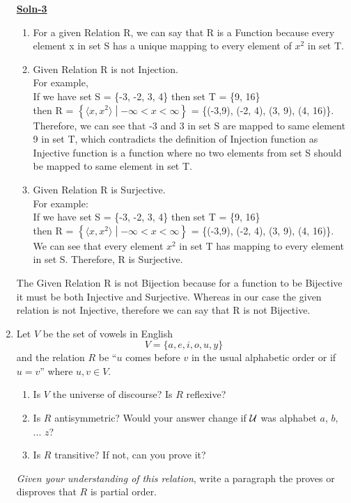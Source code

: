 \documentclass{article}
\begin{document}
\begin{enumerate}
        \textbf{\underline{Soln-3}} 
        \begin{enumerate}
            \item   For a given Relation R, we can say that R is a Function because every element x in set S has a unique mapping to every element of $x^2$ in set T.
            \item   Given Relation R is not Injection. \\
            For example, \\
            If we have set S = \{-3, -2, 3, 4\} then set T = \{9, 16\} \\
            then R = $\left\{ \langle x, x^2 \rangle \middle|-\infty < x < \infty \right\}$ = \{(-3,9), (-2, 4), (3, 9), (4, 16)\}. \\
            Therefore, we can see that -3 and 3 in set S are mapped to same element 9 in set T, 
            which contradicts the definition of Injection function as Injective function is a function where no two elements from set S 
            should be mapped to same element in set T.
            \item  Given Relation R is Surjective. \\
            For example: \\
            If we have set S = \{-3, -2, 3, 4\} then set T = \{9, 16\} \\
            then R = $\left\{ \langle x, x^2 \rangle \middle|-\infty < x < \infty \right\}$ = \{(-3,9), (-2, 4), (3, 9), (4, 16)\}. \\
            We can see that every element $x^2$ in set T has mapping to every element in set S. Therefore, R is Surjective.
        \end{enumerate}

        The Given Relation R is not Bijection because for a function to be Bijective it must be both Injective and Surjective. 
        Whereas in our case the given relation is not Injective, therefore we can say that R is not Bijective.

\item   Let $V$ be the set of vowels in English
            \[ V = \{a,e,i,o,u,y\} \]
        and the relation $R$ be ``$u$ comes before $v$ in the usual
        alphabetic order or if $u=v$'' where $u,v \in V$.
        \begin{enumerate}
        \item   Is $V$ the universe of discourse?  Is $R$ reflexive?
        \item   Is $R$ antisymmetric?  Would your answer change if
                ${\cal U}$ was alphabet $a$, $b,$ ... $z$?
        \item   Is $R$ transitive?  If not, can you prove it?
        \end{enumerate}
        \par
        \emph{Given your understanding of this relation}, write a paragraph
        the proves or disproves that $R$ is partial order.


\end{enumerate}
\end{document}
